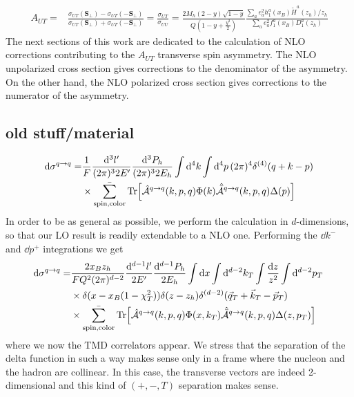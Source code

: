 \begin{equation}
\begin{aligned}
    A_{UT}=&\frac{\sigma_{UT}(\boldsymbol{S_\perp})-\sigma_{UT}(-\boldsymbol{S_\perp})}{\sigma_{UT}(\boldsymbol{S_\perp})+\sigma_{UT}(-\boldsymbol{S_\perp})}=\frac{\sigma_{UT}}{\sigma_{UU}}= \frac{2M_h(2-y)\sqrt{1-y}}{Q(1-y+\frac{y^2}{2})}\frac{ \sum_a e_a^2 h_1^a(x_B)\tilde{H}^a(z_h)/z_h}{\sum_a e_a^2 f_1^a(x_B)D_1^a(z_h)}
\end{aligned}
\end{equation}
The next sections of this work are dedicated to the calculation of NLO corrections contributing to the $A_{UT}$ transverse spin asymmetry. The NLO unpolarized cross section gives corrections to the denominator of the asymmetry. On the other hand, the NLO polarized cross section gives corrections to the numerator of the asymmetry.



\newpage
\subsection{old stuff/material}
\begin{equation}
\begin{aligned}
        \dd \sigma^{q \to q} = &\frac{1}{F}\frac{\dd ^3l'}{(2\pi)^3 2E'}\frac{\dd^3P_h}{(2\pi)^3 2E_h}\int \dd^4k\int \dd^4p \,(2\pi)^4 \delta^{(4)}(q+k-p)\\&\times\bar{\sum_{\text{spin,color}}}\Tr[\hat{\mathcal{A}}^{q\to q}(k,p,q) \Phi(k)\hat{\bar{\mathcal{A}}}^{q\to q}(k,p,q)\Delta(p)]
\end{aligned}
\end{equation}
In order to be as general as possible, we perform the calculation in $d$-dimensions, so that our LO result is readily extendable to a NLO one. Performing the $\dd k^-$ and $\dd p^+$ integrations we get
\begin{equation}\label{eq:sigmaqqv1}
    \begin{aligned}
        \dd \sigma^{q \to q} = &\frac{2x_B z_h}{FQ^2(2\pi)^{d-2}}\frac{\dd ^{d-1}l'}{2E'}\frac{\dd^{d-1}P_h}{ 2E_h}\int \dd x \int \dd^{d-2}k_T\int \frac{\dd z}{z^2}\int \dd^{d-2}p_T \,\\
        &\times\delta(x-x_B(1-\chi_T^2))\delta(z-z_h)\delta^{(d-2)}(\vec q_T+\vec k_T-\vec p_T)\\&\times\bar{\sum_{\text{spin,color}}}\Tr[\hat{\mathcal{A}}^{q\to q}(k,p,q) \Phi(x,k_T)\hat{\bar{\mathcal{A}}}^{q\to q}(k,p,q)\Delta(z,p_T)]
    \end{aligned}
\end{equation}
where we now the TMD correlators appear. We stress that the separation of the delta function in such a way makes sense only in a frame where the nucleon and the hadron are collinear. In this case, the transverse vectors are indeed 2-dimensional and this kind of $(+,-,T)$ separation makes sense. \\

